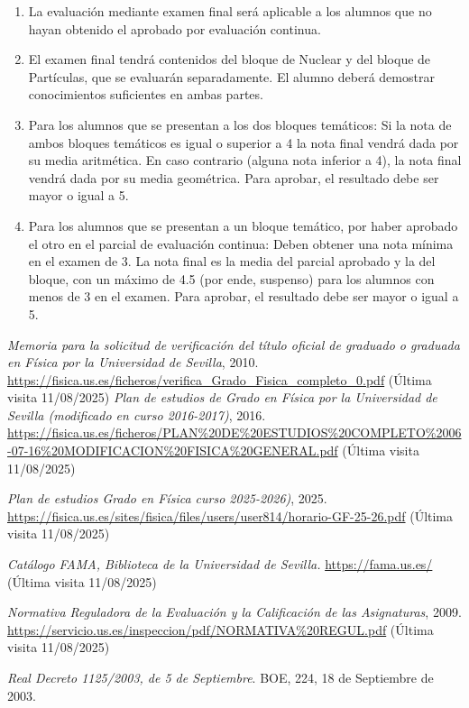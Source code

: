\documentclass[a4paper,12pt,twoside]{article}
\begin{document}
\begin{itemize}
\begin{enumerate}[label=\alph*)]
\item La evaluación mediante examen final será aplicable a los alumnos que no hayan obtenido el
aprobado por evaluación continua.
\item El examen final tendrá contenidos del bloque de Nuclear y del bloque de Partículas, que se
evaluarán separadamente. El alumno deberá demostrar conocimientos suficientes en ambas
partes.
\item Para los alumnos que se presentan a los dos bloques temáticos: Si la nota de ambos bloques
temáticos es igual o superior a 4 la nota final vendrá dada por su media aritmética. En caso
contrario (alguna nota inferior a 4), la nota final vendrá dada por su media geométrica. Para
aprobar, el resultado debe ser mayor o igual a 5.
\item Para los alumnos que se presentan a un bloque temático, por haber aprobado el otro en el parcial de evaluación continua: Deben obtener una nota mínima en el examen de 3. La nota final es la media del parcial aprobado y la del bloque, con un máximo de 4.5 (por ende, suspenso) para los alumnos con menos de 3 en el examen. Para aprobar, el resultado debe ser mayor o igual a 5. 
\end{enumerate}
\end{itemize}

\begin{thebibliography}{99}
\textit{Memoria para la solicitud de verificación del título oficial de graduado o graduada en Física por la Universidad de Sevilla}, 2010. \url{https://fisica.us.es/ficheros/verifica_Grado_Fisica_completo_0.pdf} (Última visita 11/08/2025)
\textit{Plan de estudios de Grado en Física por la Universidad de Sevilla (modificado en curso 2016-2017)}, 2016. \url{https://fisica.us.es/ficheros/PLAN\%20DE\%20ESTUDIOS\%20COMPLETO\%2006-07-16\%20MODIFICACION\%20FISICA\%20GENERAL.pdf} (Última visita 11/08/2025)

\textit{Plan de estudios Grado en Física curso 2025-2026)}, 2025.
\url{https://fisica.us.es/sites/fisica/files/users/user814/horario-GF-25-26.pdf} (Última visita 11/08/2025)

\textit{Catálogo FAMA, Biblioteca de la Universidad de Sevilla.} \url{https://fama.us.es/} (Última visita 11/08/2025)

\textit{Normativa Reguladora de la Evaluación y la Calificación de las Asignaturas}, 2009. \url{https://servicio.us.es/inspeccion/pdf/NORMATIVA\%20REGUL.pdf} (Última visita 11/08/2025)

 \textit{Real Decreto 1125/2003, de 5 de Septiembre}. BOE, 224, 18 de Septiembre de 2003.

\end{thebibliography}
\end{document}
